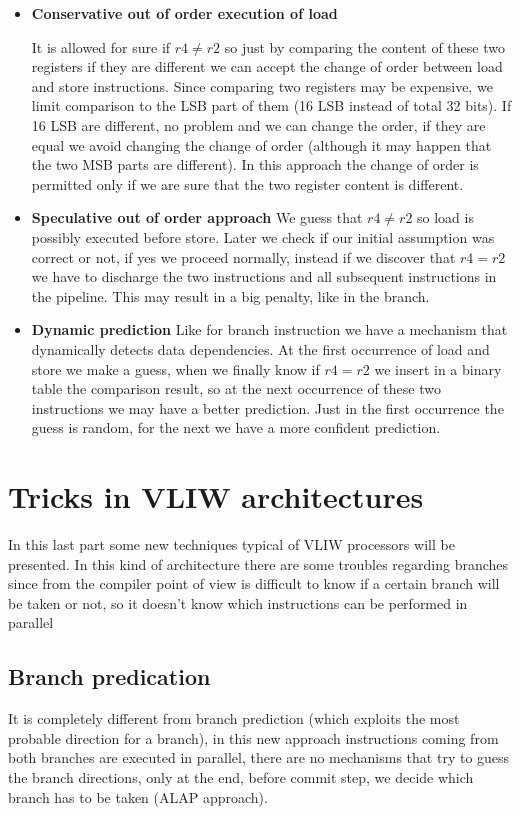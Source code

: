 \begin{itemize}
  \item \textbf{Conservative out of order execution of load}

  It is allowed for sure if $r4 \neq r2$ so just by comparing the content of these two registers if they are different we can accept the change of order between load and store instructions.  Since comparing two registers may be expensive, we limit comparison to the LSB part of them (16 LSB instead of total 32 bits). If 16 LSB are different, no problem and we can change the order, if they are equal we avoid changing the change of order (although it may happen that the two MSB parts are different). In this approach the change of order is permitted only if we are sure that the two register content is different.

  \item \textbf{Speculative out of order approach}
  We guess that $r4 \neq r2$ so load is possibly executed before store. Later we check if our initial assumption was correct or not, if yes we proceed normally, instead if we discover that $r4=r2$ we have to discharge the two instructions and all subsequent instructions in the pipeline. This may result in a big penalty, like in the branch.

  \item \textbf{Dynamic prediction}
  Like for branch instruction we have a mechanism that dynamically detects data dependencies. At the first occurrence of load and store we make a guess, when we finally know if $r4=r2$ we insert in a binary table the comparison result, so at the next occurrence of these two instructions we may have a better prediction. Just in the first occurrence the guess is random, for the next we have a more confident prediction.

\end{itemize}

\section{Tricks in VLIW architectures}

In this last part some new techniques typical of VLIW processors will be presented. In this kind of architecture there are some troubles regarding branches since from the compiler point of view is difficult to know if a certain branch will be taken or not, so it doesn't know which instructions can be performed in parallel

\subsection{Branch predication}
It is completely different from branch prediction (which exploits the most probable direction for a branch), in this new approach instructions coming from both branches are executed in parallel, there are no mechanisms that try to guess the branch directions, only at the end, before commit step, we decide which branch has to be taken (ALAP approach).

